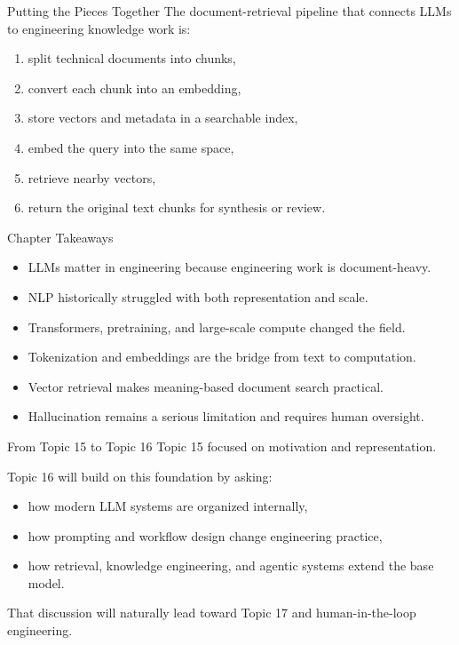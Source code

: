 \documentclass[12pt]{beamer}
\begin{document}
\begin{frame}{Putting the Pieces Together}
  The document-retrieval pipeline that connects LLMs to engineering knowledge work is:
  \begin{enumerate}
    \item split technical documents into chunks,
    \item convert each chunk into an embedding,
    \item store vectors and metadata in a searchable index,
    \item embed the query into the same space,
    \item retrieve nearby vectors,
    \item return the original text chunks for synthesis or review.
  \end{enumerate}
\end{frame}

\begin{frame}{Chapter Takeaways}
  \begin{itemize}
    \item LLMs matter in engineering because engineering work is document-heavy.
    \item NLP historically struggled with both representation and scale.
    \item Transformers, pretraining, and large-scale compute changed the field.
    \item Tokenization and embeddings are the bridge from text to computation.
    \item Vector retrieval makes meaning-based document search practical.
    \item Hallucination remains a serious limitation and requires human oversight.
  \end{itemize}
\end{frame}

\begin{frame}{From Topic 15 to Topic 16}
  Topic 15 focused on motivation and representation.

  Topic 16 will build on this foundation by asking:
  \begin{itemize}
    \item how modern LLM systems are organized internally,
    \item how prompting and workflow design change engineering practice,
    \item how retrieval, knowledge engineering, and agentic systems extend the base model.
  \end{itemize}

  That discussion will naturally lead toward Topic 17 and human-in-the-loop engineering.
\end{frame}
\end{document}
